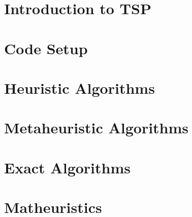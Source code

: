 \documentclass[a4paper,12pt]{book}
\begin{document}
\thispagestyle{empty} %
\cleardoublepage

\thispagestyle{empty}

\clearpage{\pagestyle{plain}\cleardoublepage}


\clearpage{\pagestyle{plain}\cleardoublepage}

\tableofcontents %

\clearpage{\pagestyle{plain}\cleardoublepage} %

\clearpage{\pagestyle{plain}\cleardoublepage} 
\chapter{Introduction to TSP} 
\label{chapter:intro} 


\clearpage{\pagestyle{plain}\cleardoublepage} 
\chapter{Code Setup} 
\label{chapter:code} 


\clearpage{\pagestyle{plain}\cleardoublepage} 
\chapter{Heuristic Algorithms} 
\label{chapter:heuristics} 
 

\clearpage{\pagestyle{plain}\cleardoublepage} 
\chapter{Metaheuristic Algorithms} 
\label{chapter:meta} 
 

\clearpage{\pagestyle{plain}\cleardoublepage} 
\chapter{Exact Algorithms} 
\label{chapter:exact} 



\clearpage{\pagestyle{plain}\cleardoublepage} 
\chapter{Matheuristics} 
\label{chapter:matheuristics} 



\clearpage{\pagestyle{plain}\cleardoublepage}

\nocite{*}

%
\end{document}

